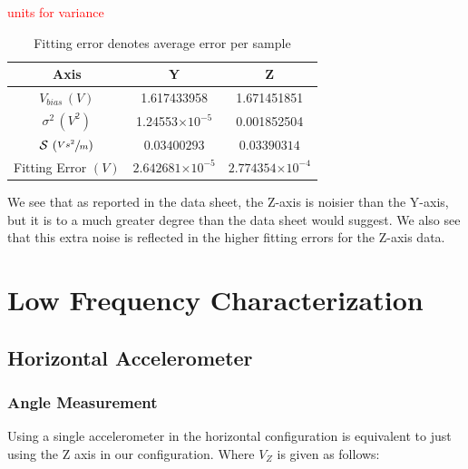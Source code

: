 \documentclass{article}
\newcommand{\xxx}[1]{\textcolor{red}{#1}}
\theoremstyle{plain}
\theoremstyle{definition}
\theoremstyle{remark}
\newcommand{\Sens}{\mathcal{S}}
\providecommand{\e}[1]{\ensuremath{\times 10^{#1}}}
\begin{document}
\xxx{units for variance}
\begin{table}
\begin{center}
    \begin{tabular}{|c|c|c|}
        \hline
        Axis                              & Y                     & Z                     \\ \hline
        $V_{bias} \, (V)$                        & 1.617433958           & 1.671451851           \\ 
        $\sigma^2 \, (V^2)$                        & 1.24553\e{-5}           & 0.001852504           \\ 
        $\Sens \, \left(\sfrac{V s^2}{m} \right)$                           & $0.03400293$     & $0.03390314$     \\ 
        Fitting Error $(V)$ & $2.642681\e{-5}$ & $2.774354\e{-4}$ \\
        \hline
    \end{tabular}
\label{ParamID_T}
\caption{Fitting error denotes average error per sample}
\end{center}
\end{table}

We see that as reported in the data sheet, the Z-axis is noisier than the Y-axis, but it is to a much greater degree than the data sheet would suggest.  We also see that this extra noise is reflected in the higher fitting errors for the Z-axis data.  


\clearpage
\section{Low Frequency Characterization}

\subsection{Horizontal Accelerometer}

\subsubsection{Angle Measurement}

Using a single accelerometer in the horizontal configuration is equivalent to just using the Z axis in our configuration.  Where $V_{Z}$ is given as follows: 
\end{document}
